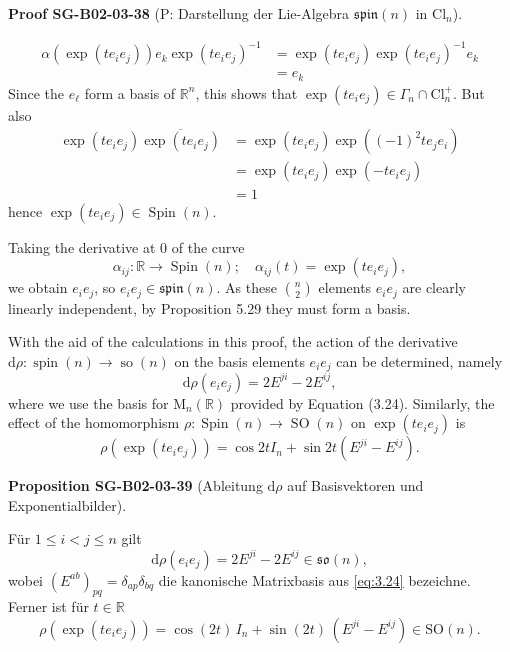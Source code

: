 \documentclass[10pt, letterpaper]{article}
\newcommand{\R}{\mathbb{R}}
\newcommand{\Cl}{\mathrm{Cl}}
\newcommand{\SO}{\mathrm{SO}}
\newcommand{\CustomHeading}[3]{%
  \par\medskip\noindent%
  \textbf{#1 #2} \textnormal{(#3)}.\enskip%
}
\newenvironment{PROP}[2]{\begin{unitbox}\CustomHeading{Proposition}{#1}{#2}}{\end{unitbox}}
\newenvironment{PROOF}[2]{\begin{unitbox}\CustomHeading{Proof}{#1}{#2}}{\end{unitbox}}
\begin{document}
\begin{PROOF}{SG-B02-03-38}{P: Darstellung der Lie-Algebra \(\mathfrak{spin}(n)\) in \(\Cl_n\)}
$$
\begin{aligned}
\alpha\left(\exp \left(t e_{i} e_{j}\right)\right) e_{k} \exp \left(t e_{i} e_{j}\right)^{-1} & =\exp \left(t e_{i} e_{j}\right) \exp \left(t e_{i} e_{j}\right)^{-1} e_{k} \\
& =e_{k}
\end{aligned}
$$
Since the $e_{\ell}$ form a basis of $\mathbb{R}^{n}$, this shows that $\exp \left(t e_{i} e_{j}\right) \in \Gamma_{n} \cap \mathrm{Cl}_{n}^{+}$. But also
$$
\begin{aligned}
\exp \left(t e_{i} e_{j}\right) \overline{\exp \left(t e_{i} e_{j}\right)} & =\exp \left(t e_{i} e_{j}\right) \exp \left((-1)^{2} t e_{j} e_{i}\right) \\
& =\exp \left(t e_{i} e_{j}\right) \exp \left(-t e_{i} e_{j}\right) \\
& =1
\end{aligned}
$$
hence $\exp \left(t e_{i} e_{j}\right) \in \operatorname{Spin}(n)$.

Taking the derivative at 0 of the curve
$$
\alpha_{i j}: \mathbb{R} \longrightarrow \operatorname{Spin}(n) ; \quad \alpha_{i j}(t)=\exp \left(t e_{i} e_{j}\right),
$$
we obtain $e_{i} e_{j}$, so $e_{i} e_{j} \in \mathfrak{s p i n}(n)$. As these $\binom{n}{2}$ elements $e_{i} e_{j}$ are clearly linearly independent, by Proposition 5.29 they must form a basis.
\end{PROOF}




With the aid of the calculations in this proof, the action of the derivative $\mathrm{d} \rho: \operatorname{spin}(n) \longrightarrow \operatorname{so}(n)$ on the basis elements $e_{i} e_{j}$ can be determined, namely
$$
\mathrm{d} \rho\left(e_{i} e_{j}\right)=2 E^{j i}-2 E^{i j},
$$
where we use the basis for $\mathrm{M}_{n}(\mathbb{R})$ provided by Equation (3.24). Similarly, the effect of the homomorphism $\rho: \operatorname{Spin}(n) \longrightarrow \operatorname{SO}(n)$ on $\exp \left(t e_{i} e_{j}\right)$ is
$$
\rho\left(\exp \left(t e_{i} e_{j}\right)\right)=\cos 2 t I_{n}+\sin 2 t\left(E^{j i}-E^{i j}\right) .
$$



\begin{PROP}{SG-B02-03-39}{Ableitung \(\mathrm d\rho\) auf Basisvektoren und Exponentialbilder}
Für \(1\le i<j\le n\) gilt
\[
\mathrm d\rho\!\left(e_i e_j\right)=2E^{ji}-2E^{ij}\in\mathfrak{so}(n),
\]
wobei \((E^{ab})_{pq}=\delta_{ap}\delta_{bq}\) die kanonische Matrixbasis aus \eqref{eq:3.24} bezeichne.
Ferner ist für \(t\in\R\)
\[
\rho\!\left(\exp(te_i e_j)\right)
=\cos(2t)\,I_n+\sin(2t)\,(E^{ji}-E^{ij})\in\SO(n).
\]
\end{PROP}
\end{document}
